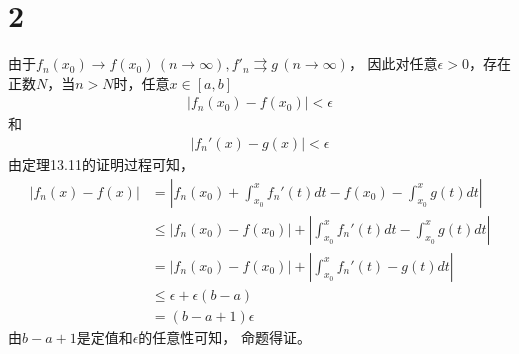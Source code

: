 \documentclass{article}
\begin{document}
\section*{2}

由于$f_n(x_0) \to f(x_0) \, (n \to \infty), f'_n \rightrightarrows g \, (n \to \infty)$，
因此对任意$\epsilon > 0$，存在正数$N$，当$n > N$时，任意$x \in [a, b]$
\begin{align*}
  |f_n(x_0) - f(x_0)| < \epsilon
\end{align*}
和
\begin{align*}
  |f_n'(x) - g(x)| < \epsilon
\end{align*}
由定理13.11的证明过程可知，
\begin{align*}
  |f_n(x) - f(x)|
   & = \left|f_n(x_0) + \int_{x_0}^{x} f_n'(t) dt - f(x_0) - \int_{x_0}^{x} g(t) dt \right|                   \\
   & \leq \left|f_n(x_0) - f(x_0) \right| + \left| \int_{x_0}^{x} f_n'(t) dt - \int_{x_0}^{x} g(t) dt \right| \\
   & = \left|f_n(x_0) - f(x_0) \right| + \left| \int_{x_0}^{x} f_n'(t) - g(t) dt \right|                      \\
   & \leq \epsilon + \epsilon (b - a)                                                                         \\
   & = (b - a + 1)\epsilon
\end{align*}
由$b - a + 1$是定值和$\epsilon$的任意性可知，
命题得证。
\end{document}

